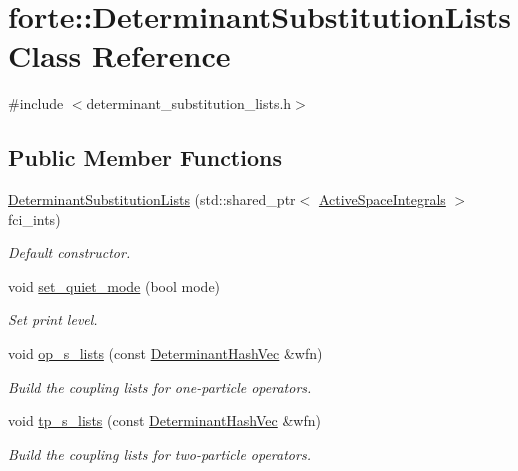 \hypertarget{classforte_1_1_determinant_substitution_lists}{}\section{forte\+:\+:Determinant\+Substitution\+Lists Class Reference}
\label{classforte_1_1_determinant_substitution_lists}


{\ttfamily \#include $<$determinant\+\_\+substitution\+\_\+lists.\+h$>$}

\subsection*{Public Member Functions}
\begin{DoxyCompactItemize}
\item 
\mbox{\hyperlink{classforte_1_1_determinant_substitution_lists_a35a24415ca3d45669f01afcbb365b12d}{Determinant\+Substitution\+Lists}} (std\+::shared\+\_\+ptr$<$ \mbox{\hyperlink{classforte_1_1_active_space_integrals}{Active\+Space\+Integrals}} $>$ fci\+\_\+ints)
\begin{DoxyCompactList}\small\item\em Default constructor. \end{DoxyCompactList}\item 
void \mbox{\hyperlink{classforte_1_1_determinant_substitution_lists_a12f7a6930e9fff0d178a0899a115175a}{set\+\_\+quiet\+\_\+mode}} (bool mode)
\begin{DoxyCompactList}\small\item\em Set print level. \end{DoxyCompactList}\item 
void \mbox{\hyperlink{classforte_1_1_determinant_substitution_lists_ac3fca4f728b3acc5cff46ccbbaa1b1b5}{op\+\_\+s\+\_\+lists}} (const \mbox{\hyperlink{classforte_1_1_determinant_hash_vec}{Determinant\+Hash\+Vec}} \&wfn)
\begin{DoxyCompactList}\small\item\em Build the coupling lists for one-\/particle operators. \end{DoxyCompactList}\item 
void \mbox{\hyperlink{classforte_1_1_determinant_substitution_lists_afbcf9837fbd1f0ba05c2959853896c00}{tp\+\_\+s\+\_\+lists}} (const \mbox{\hyperlink{classforte_1_1_determinant_hash_vec}{Determinant\+Hash\+Vec}} \&wfn)
\begin{DoxyCompactList}\small\item\em Build the coupling lists for two-\/particle operators. \end{DoxyCompactList}\item 

\end{DoxyCompactItemize}
